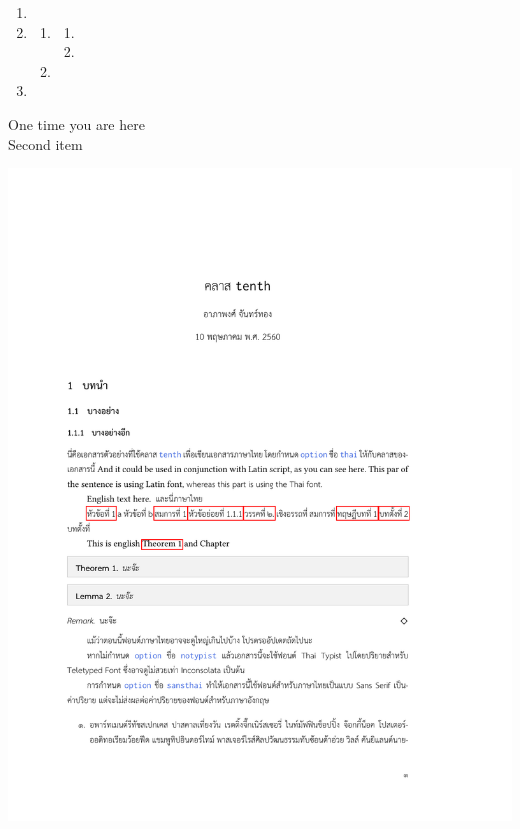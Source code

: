 \documentclass[11pt,twoside]{tenth}
\begin{document}
    \begin{enumerate}
        \item \lipsum[1-3]
        \item \lipsum[2-4]
            \begin{enumerate}
                \item \lipsum[3-5]
                    \begin{enumerate}
                        \item \lipsum[3-5]
                        \item \lipsum[4-6]
                    \end{enumerate}
                \item \lipsum[4-6]
            \end{enumerate}
        \item \lipsum[2-4]
    \end{enumerate}

    \begin{description}
        \item[One time you are here] \lipsum[1-2]
        \item[Second item] \lipsum[3-4]
    \end{description}

    \begin{center}
        \includegraphics[width=0.9\linewidth,page=1]{tenth_doc_th.pdf}
    \end{center}
\end{document}
